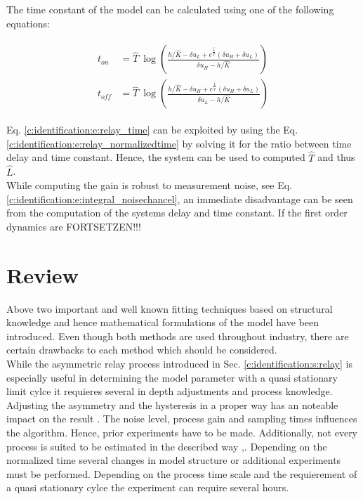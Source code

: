 The time constant of the model can be calculated using one of the following equations:

\begin{align}
\begin{split}
t_{on} &= \hat{T}~ \log\left( \frac{h/\hat{K}-\delta u_L + e^\frac{\hat{L}}{\hat{T}} \left(\delta u_H + \delta u_L \right) }{\delta u_H - h/\hat{K}}\right) \\
t_{off} &= \hat{T}~  \log\left( \frac{h/\hat{K}-\delta u_H + e^\frac{\hat{L}}{\hat{T}} \left(\delta u_H + \delta u_L \right) }{\delta u_L - h/\hat{K}}\right) 
\end{split}
\label{c:identification:e:relay_time}
\end{align}

Eq. \ref{c:identification:e:relay_time} can be exploited by using the Eq. \ref{c:identification:e:relay_normalizedtime} by solving it for the ratio between time delay and time constant. Hence, the system can be used to computed $\hat{T}$ and thus $\hat{L}$. \\

While computing the gain is robust to measurement noise, see Eq. \ref{c:identification:e:integral_noisechancel}, an immediate disadvantage can be seen from the computation of the systems delay and time constant. If the first order dynamics are FORTSETZEN!!!

\section{Review}
\label{c:identification:s:review}

Above two important and well known fitting techniques based on structural knowledge and hence mathematical formulations of the model have been introduced. Even though both methods are used throughout industry, there are certain drawbacks to each method which should be considered.\\

While the asymmetric relay process introduced in Sec. \ref{c:identification:s:relay} is especially useful in determining the model parameter with a quasi stationary limit cylce it requieres several in depth adjustments and process knowledge. Adjusting the asymmetry and the hysteresis in a proper way has an noteable impact on the result \cite{Berner2016a}. The noise level, process gain and sampling times influences the algorithm. Hence, prior experiments have to be made. Additionally, not every process is suited to be estimated in the described way \cite{Berner2016a},\cite{Berner2015}. Depending on the normalized time several changes in model structure or additional experiments must be performed. Depending on the process time scale and the requierement of a quasi stationary cylce the experiment can require several hours.\\

